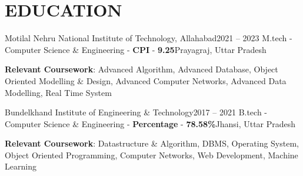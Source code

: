 \section{EDUCATION} {
    \resumeSubHeadingListStart
        \resumeSubheading
            {Motilal Nehru National Institute of Technology, Allahabad}{2021 -- 2023}
            {M.tech - Computer Science \& Engineering - \textbf{CPI} - \textbf{9.25}}{Prayagraj, Uttar Pradesh}

            \small{\textbf{Relevant Coursework}: Advanced Algorithm, Advanced Database, Object Oriented Modelling \& Design, Advanced Computer Networks, Advanced Data Modelling, Real Time System}
    \resumeSubHeadingListEnd

    \vspace{-10pt}
    \resumeSubHeadingListStart
        \resumeSubheading
            {Bundelkhand Institute of Engineering \& Technology}{2017 -- 2021}
            {B.tech - Computer Science \& Engineering  - \textbf{Percentage} - \textbf{78.58\%}}{Jhansi, Uttar Pradesh}
            
            \small{\textbf{Relevant Coursework}: Datastructure \& Algorithm, DBMS, Operating System, Object Oriented Programming, Computer Networks, Web Development, Machine Learning}
    \resumeSubHeadingListEnd
    
    
}